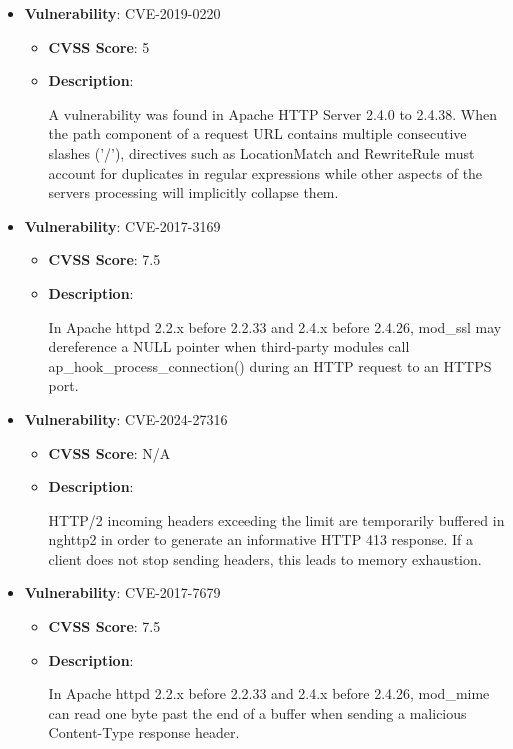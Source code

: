 \documentclass{article}
\begin{document}
\begin{itemize}
    
        \item \textbf{Vulnerability}: CVE-2019-0220
        \begin{itemize}
            \item \textbf{CVSS Score}:  5 
            \item \textbf{Description}:
            \parbox[t]{0.9\linewidth}{
                \ttfamily A vulnerability was found in Apache HTTP Server 2.4.0 to 2.4.38. When the path component of a request URL contains multiple consecutive slashes ('/'), directives such as LocationMatch and RewriteRule must account for duplicates in regular expressions while other aspects of the servers processing will implicitly collapse them.
            }
        \end{itemize}
    
        \item \textbf{Vulnerability}: CVE-2017-3169
        \begin{itemize}
            \item \textbf{CVSS Score}:  7.5 
            \item \textbf{Description}:
            \parbox[t]{0.9\linewidth}{
                \ttfamily In Apache httpd 2.2.x before 2.2.33 and 2.4.x before 2.4.26, mod\_ssl may dereference a NULL pointer when third-party modules call ap\_hook\_process\_connection() during an HTTP request to an HTTPS port.
            }
        \end{itemize}
    
        \item \textbf{Vulnerability}: CVE-2024-27316
        \begin{itemize}
            \item \textbf{CVSS Score}:  N/A 
            \item \textbf{Description}:
            \parbox[t]{0.9\linewidth}{
                \ttfamily HTTP/2 incoming headers exceeding the limit are temporarily buffered in nghttp2 in order to generate an informative HTTP 413 response. If a client does not stop sending headers, this leads to memory exhaustion.
            }
        \end{itemize}
    
        \item \textbf{Vulnerability}: CVE-2017-7679
        \begin{itemize}
            \item \textbf{CVSS Score}:  7.5 
            \item \textbf{Description}:
            \parbox[t]{0.9\linewidth}{
                \ttfamily In Apache httpd 2.2.x before 2.2.33 and 2.4.x before 2.4.26, mod\_mime can read one byte past the end of a buffer when sending a malicious Content-Type response header.
            }
        \end{itemize}
    

\end{itemize}
\end{document}
